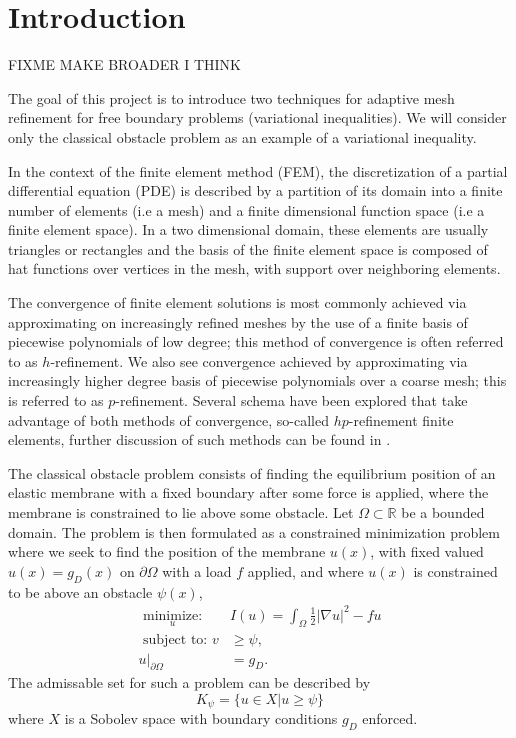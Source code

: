 \documentclass[]{interact}
\theoremstyle{plain}%
\theoremstyle{definition}
\theoremstyle{remark}
\newcommand{\RR}{\mathbb{R}}
\newcommand{\abs}[1]{\left| #1 \right|}
\begin{document}


\section{Introduction} \label{sec:intro}

FIXME MAKE BROADER I THINK

The goal of this project is to introduce two techniques for adaptive mesh refinement for free boundary problems (variational inequalities). We will consider only the classical obstacle problem as an example of a variational inequality. 

In the context of the finite element method (FEM), the discretization of a partial differential equation (PDE) is described by a partition of its domain into a finite number of elements (i.e a mesh) and a finite dimensional function space (i.e a finite element space). In a two dimensional domain, these elements are usually triangles or rectangles and the basis of the finite element space is composed of hat functions over vertices in the mesh, with support over neighboring elements. 

The convergence of finite element solutions is most commonly achieved via approximating on increasingly refined meshes by the use of a finite basis of piecewise polynomials of low degree; this method of convergence is often referred to as $h$-refinement. We also see convergence achieved by approximating via increasingly higher degree basis of piecewise polynomials over a coarse mesh; this is referred to as $p$-refinement. Several schema have been explored that take advantage of both methods of convergence, so-called $hp$-refinement finite elements, further discussion of such methods can be found in \cite{Demkowicz2007}.

The classical obstacle problem consists of finding the equilibrium position of an elastic membrane with a fixed boundary after some force is applied, where the membrane is constrained to lie above some obstacle. Let $\Omega \subset \RR$ be a bounded domain. The problem is then formulated as a constrained minimization problem where we seek to find the position of the membrane $u(x)$, with fixed valued $u(x) = g_D(x)$ on $\partial \Omega$ with a load $f$ applied, and where $u(x)$ is constrained to be above an obstacle $\psi(x)$, 
\begin{align}
    \underset{u}{\text{ minimize: }}  &I(u) = \int_\Omega \frac{1}{2} \abs{\nabla u}^2 - fu \\
  \text{ subject to: } v &\geq \psi, \\
    u |_{\partial\Omega} &= g_D. 
  \end{align}
  The admissable set for such a problem can be described by 
  \begin{equation}
    K_\psi = \{u \in X| u \geq \psi \}
  \end{equation}
  where $X$ is a Sobolev space with boundary conditions $g_D$ enforced. 
  
\end{document}
